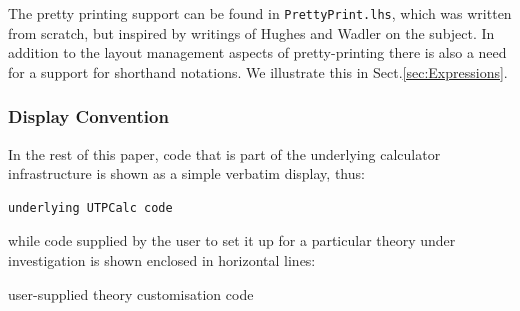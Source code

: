 \noindent
The pretty printing support can be found in \texttt{PrettyPrint.lhs},
which was written from scratch, but inspired by writings of
Hughes\cite{HughesJohn1995c} and Wadler\cite{wadler-pp}
on the subject.
In addition to the layout management aspects of pretty-printing
there is also a need for a support for shorthand notations.
We illustrate this in Sect.\ref{sec:Expressions}.


%

\subsubsection{Display Convention}

In the rest of this paper, code that is part of the underlying
calculator infrastructure is shown as a simple verbatim display, thus:
\begin{verbatim}
underlying UTPCalc code
\end{verbatim}
while code supplied by the user to set it up for a particular
theory under investigation is shown enclosed in horizontal lines:
\begin{code}
user-supplied theory customisation code
\end{code}
